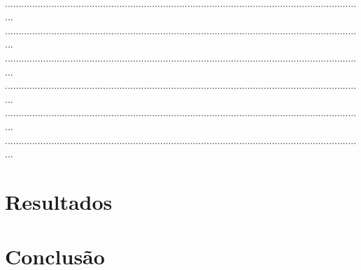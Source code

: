 \begin{enumerate}[label=Q\arabic*]
    \\
    ....................................................................................................................................
    \\
    ....................................................................................................................................
    \\
    ....................................................................................................................................
    \\
    ....................................................................................................................................
    \\
    ....................................................................................................................................
    \\
    ....................................................................................................................................
    
\end{enumerate}

\section{Resultados}

\section{Conclusão}